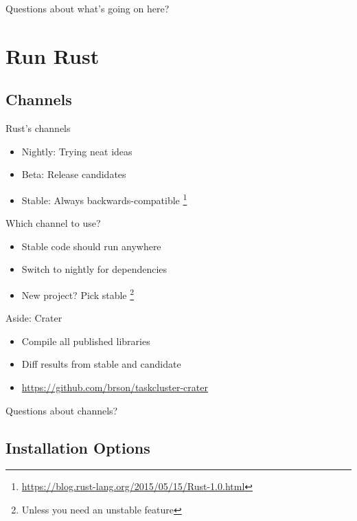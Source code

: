\documentclass[50pt]{beamer}
\begin{document}
\begin{frame}
    Questions about what's going on here?
\end{frame}

\section{Run Rust}

\subsection{Channels}

\begin{frame}
    Rust's channels
    \begin{itemize}
        \item Nightly: Trying neat ideas
        \item Beta: Release candidates
        \item Stable: Always backwards-compatible \footnote{\url{https://blog.rust-lang.org/2015/05/15/Rust-1.0.html}}
    \end{itemize}
\end{frame}

\begin{frame}
    Which channel to use?
    \begin{itemize}
        \item Stable code should run anywhere
        \item Switch to nightly for dependencies
        \item New project? Pick stable \footnote{Unless you need an
              unstable feature}
    \end{itemize}
\end{frame}

\begin{frame}
    Aside: Crater
    \begin{itemize}
        \item Compile all published libraries
        \item Diff results from stable and candidate
        \item \url{https://github.com/brson/taskcluster-crater}
    \end{itemize}
\end{frame}

\begin{frame}
    Questions about channels?
\end{frame}


\subsection{Installation Options}
\end{document}
